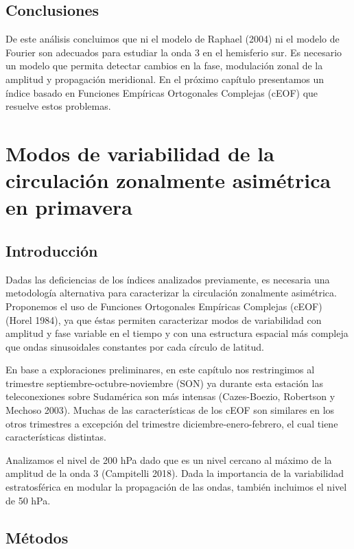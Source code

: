\documentclass[12pt,oneside,a4paper]{reedthesis}
\begin{document}
\hypertarget{conclusiones}{%
\section{Conclusiones}\label{conclusiones}}

De este análisis concluimos que ni el modelo de Raphael (2004) ni el modelo de Fourier son adecuados para estudiar la onda 3 en el hemisferio sur.
Es necesario un modelo que permita detectar cambios en la fase, modulación zonal de la amplitud y propagación meridional.
En el próximo capítulo presentamos un índice basado en Funciones Empíricas Ortogonales Complejas (cEOF) que resuelve estos problemas.

\hypertarget{ceofs}{%
\chapter{Modos de variabilidad de la circulación zonalmente asimétrica en primavera}\label{ceofs}}

\hypertarget{introducciuxf3n}{%
\section{Introducción}\label{introducciuxf3n}}

Dadas las deficiencias de los índices analizados previamente, es necesaria una metodología alternativa para caracterizar la circulación zonalmente asimétrica.
Proponemos el uso de Funciones Ortogonales Empíricas Complejas (cEOF) (Horel 1984), ya que éstas permiten caracterizar modos de variabilidad con amplitud y fase variable en el tiempo y con una estructura espacial más compleja que ondas sinusoidales constantes por cada círculo de latitud.

En base a exploraciones preliminares, en este capítulo nos restringimos al trimestre septiembre-octubre-noviembre (SON) ya durante esta estación las teleconexiones sobre Sudamérica son más intensas (Cazes-Boezio, Robertson y Mechoso 2003).
Muchas de las características de los cEOF son similares en los otros trimestres a excepción del trimestre diciembre-enero-febrero, el cual tiene características distintas.

Analizamos el nivel de 200 hPa dado que es un nivel cercano al máximo de la amplitud de la onda 3 (Campitelli 2018).
Dada la importancia de la variabilidad estratosférica en modular la propagación de las ondas, también incluimos el nivel de 50 hPa.

\hypertarget{muxe9todos-2}{%
\section{Métodos}\label{muxe9todos-2}}
\end{document}
